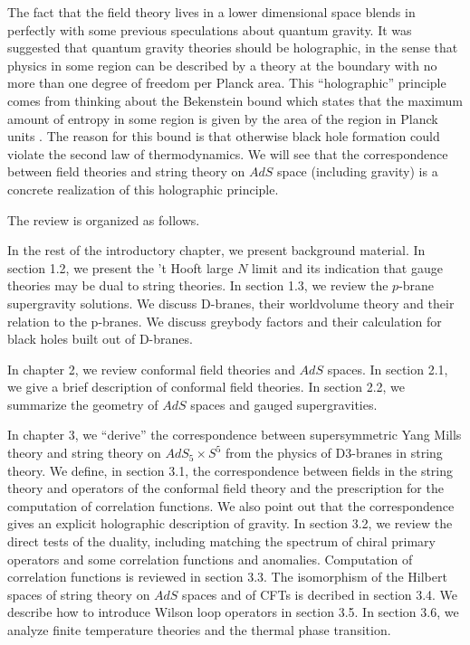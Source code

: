 The fact that the field theory lives in a lower dimensional space 
blends in perfectly with some previous speculations about quantum 
gravity. It was suggested \cite{'tHooft:1993gx,Susskind:1995vu}
 that quantum gravity theories
should be holographic, in the sense that physics in some region 
can be described by a theory at the boundary with no more than 
one degree of freedom per Planck area. This ``holographic'' 
principle comes from thinking about the Bekenstein bound which 
states that the maximum amount of entropy in some region 
is given by the area of the region in Planck units 
\cite{Bekenstein:1994dz}. 
The reason for this bound is that otherwise black hole 
formation could violate the second law of thermodynamics.
We will see that the correspondence between field theories
and string theory on $AdS$ space (including gravity) 
is a concrete realization of this holographic principle. 

The review is organized as follows. 

In the rest of the introductory chapter, we present background material.
In section 1.2, we present the   
't Hooft large $N$ limit and its indication that gauge theories may be 
dual to string theories.
In section 1.3, we review the $p$-brane supergravity solutions.
We discuss D-branes, their worldvolume theory and their relation to the p-branes.
We discuss greybody factors and their calculation for
black holes built out of D-branes.  

In chapter 2, we review conformal field theories and $AdS$ spaces.
In section 2.1, we give a brief description of conformal field theories.
In section 2.2, we summarize
the geometry of $AdS$ spaces and gauged supergravities.

In chapter 3,
we ``derive'' the correspondence between supersymmetric
Yang Mills theory and string theory on 
$AdS_5 \times S^5$ from the physics of D3-branes in
string theory. We define, in section 3.1, the correspondence 
between fields in 
the string theory and operators of the conformal field theory and
the prescription for the computation of correlation functions.
We also point out that the correspondence gives an explicit
holographic description of gravity. 
In section 3.2,
we review the direct tests of the duality, including
matching the spectrum of chiral primary operators and some correlation functions
and anomalies. Computation
of correlation functions is reviewed in section 3.3.
The isomorphism of the Hilbert spaces of string theory on $AdS$ spaces and 
of CFTs is decribed in section 3.4.
We describe
how to introduce Wilson loop operators in section 3.5. 
In section 3.6, we analyze  finite temperature theories 
and the thermal phase transition.

